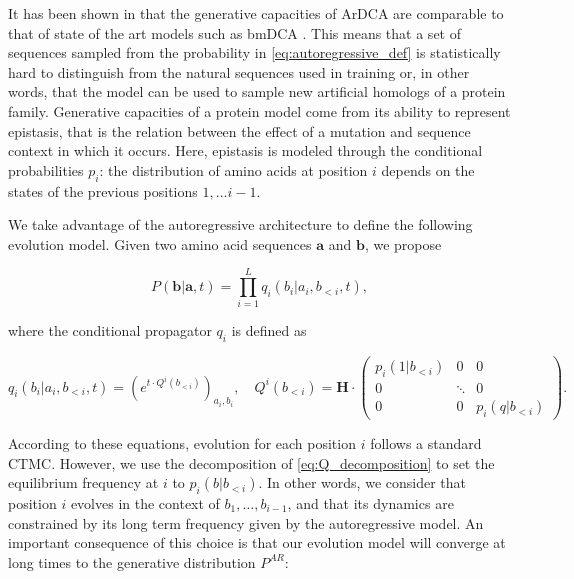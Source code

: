 It has been shown in \cite{trinquier_efficientgenerativemodeling_2021} that the generative capacities of ArDCA are comparable to that of state of the art models such as bmDCA \cite{mcgee_generativecapacityprobabilistic_2021}. 
This means that a set of sequences sampled from the probability in \eqref{eq:autoregressive_def} is statistically hard to distinguish from the natural sequences used in training or, in other words, that the model can be used to sample new artificial homologs of a protein family. 
Generative capacities of a protein model come from its ability to represent epistasis, that is the relation between the effect of a mutation and sequence context in which it occurs. 
Here, epistasis is modeled through the conditional probabilities $p_i$: the distribution of amino acids at position $i$ depends on the states of the previous positions $1, \ldots i-1$. 


We take advantage of the autoregressive architecture to define the following evolution model. 
Given two amino acid sequences $\mathbf{a}$ and $\mathbf{b}$, we propose

\begin{equation}
	\label{eq:autoregressive_propagator_full}
	P(\mathbf{b} \vert \mathbf{a}, t) = \prod_{i=1}^L q_i(b_i \vert a_i, b_{<i}, t),
\end{equation}

where the conditional propagator $q_i$ is defined as 

\begin{equation}
	\label{eq:autoregressive_site_propagator}
	q_i(b_i \vert a_i, b_{<i}, t) = \left(e^{t \cdot Q^i(b_{<i})}\right)_{a_i, b_i}, 
	\quad Q^i(b_{<i}) = \mathbf{H} \cdot \begin{pmatrix}
		p_i(1 \vert b_{<i}) & 0 & 0\\ 
		0 & \ddots & 0 \\
		0 & 0 & p_i(q \vert b_{<i})
	\end{pmatrix}. 
\end{equation}

According to these equations, evolution for each position $i$ follows a standard CTMC. 
However, we use the decomposition of \eqref{eq:Q_decomposition} to set the equilibrium frequency at $i$ to $p_i(b \vert b_{<i})$. 
In other words, we consider that position $i$ evolves in the context of $b_1, \ldots, b_{i-1}$, and that its dynamics are constrained by its long term frequency given by the autoregressive model. 
An important consequence of this choice is that our evolution model will converge at long times to the generative distribution $P^{AR}$: 

